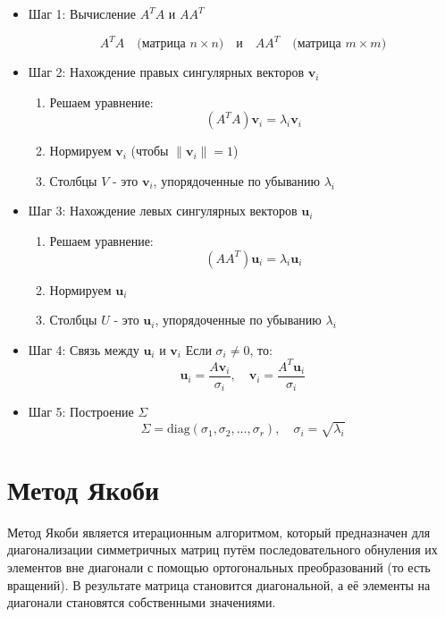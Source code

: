 \documentclass[a4paper, 12pt]{report}
\begin{document}
\begin{itemize}
    \item {Шаг 1: Вычисление $A^T A$ и $A A^T$}

    \[
A^T A \quad \text{(матрица $n \times n$)} \quad \text{и} \quad A A^T \quad \text{(матрица $m \times m$)}
\]

\item{Шаг 2: Нахождение правых сингулярных векторов 
$\mathbf{v}_i$}
\begin{enumerate}
    \item Решаем уравнение:
    \[
    (A^T A) \mathbf{v}_i = \lambda_i \mathbf{v}_i
    \]
    \item Нормируем $\mathbf{v}_i$ (чтобы $\|\mathbf{v}_i\| = 1$)
    \item Столбцы $V$ - это $\mathbf{v}_i$, упорядоченные по убыванию $\lambda_i$
\end{enumerate}


\item {Шаг 3: Нахождение левых сингулярных векторов 
$\mathbf{u}_i$}
\begin{enumerate}
    \item Решаем уравнение:
    \[
    (A A^T) \mathbf{u}_i = \lambda_i \mathbf{u}_i
    \]
    \item Нормируем $\mathbf{u}_i$
    \item Столбцы $U$ - это $\mathbf{u}_i$, упорядоченные по убыванию $\lambda_i$
\end{enumerate}



\item{Шаг 4: Связь между $\mathbf{u}_i$ и $\mathbf{v}_i$}
Если $\sigma_i \neq 0$, то:
\[
\mathbf{u}_i = \frac{A \mathbf{v}_i}{\sigma_i}, \quad \mathbf{v}_i = \frac{A^T \mathbf{u}_i}{\sigma_i}
\]



\item{Шаг 5: Построение $\Sigma$}
\[
\Sigma = \text{diag}(\sigma_1, \sigma_2, \dots, \sigma_r), \quad \sigma_i = \sqrt{\lambda_i}
\]



\end{itemize}

\section{Метод Якоби}


Метод Якоби является итерационным алгоритмом, который предназначен для диагонализации симметричных матриц путём последовательного обнуления их элементов вне диагонали с помощью ортогональных преобразований (то есть вращений). В результате матрица становится диагональной, а её элементы на диагонали становятся собственными значениями.
\end{document}
